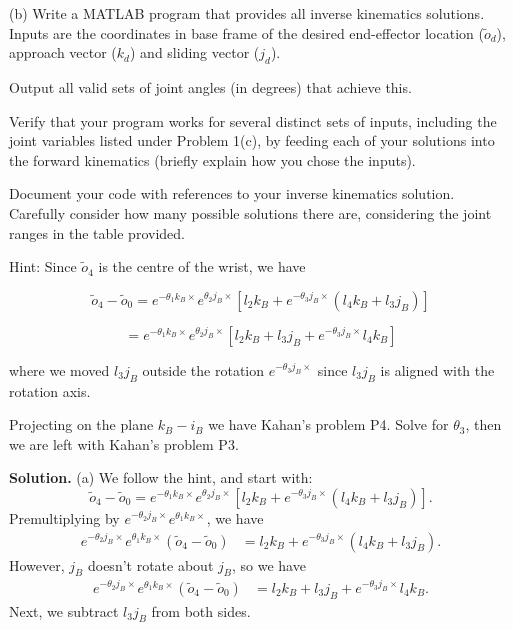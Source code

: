 \documentclass[11pt]{article}
\begin{document}
(b) Write a MATLAB program that provides all inverse kinematics solutions.
Inputs are the coordinates in base frame of the desired end-effector location
($\tilde{o}_d$), approach vector ($k_d$) and sliding vector ($j_d$).

Output all valid sets of joint angles (in degrees) that achieve this.

Verify that your program works for several distinct sets of inputs, including
the joint variables listed under Problem 1(c), by feeding each of your
solutions into the forward kinematics (briefly explain how you chose the inputs).

Document your code with references to your inverse kinematics solution.
Carefully consider how many possible solutions there are, considering the
joint ranges in the table provided.

\vspace{0.4cm}

\noindent
Hint: Since $\tilde{o}_4$ is the centre of the wrist, we have

\[
\tilde{o}_4 - \tilde{o}_0 =
e^{-\theta_1 k_B \times}
e^{\theta_2 j_B \times}
\left[
l_2 k_B
+
e^{-\theta_3 j_B \times}
(l_4 k_B + l_3 j_B)
\right]
\]

\[
=
e^{-\theta_1 k_B \times}
e^{\theta_2 j_B \times}
\left[
l_2 k_B + l_3 j_B
+
e^{-\theta_3 j_B \times} l_4 k_B
\right]
\]

where we moved $l_3 j_B$ outside the rotation $e^{-\theta_3 j_B\times}$ since
$l_3 j_B$ is aligned with the rotation axis.

Projecting on the plane $k_B - i_B$ we have Kahan’s problem P4.
Solve for $\theta_3$, then we are left with Kahan’s problem P3.

\vspace{3em}

\textbf{Solution.}
(a)
We follow the hint, and start with:
\[
    \tilde{o}_{4} - \tilde{o}_0 = e^{-\theta_1 k_B \times } e^{\theta_2 j_B \times} \left[ l_2 k_B + e^{-\theta_3 j_B \times } (l_4 k_B + l_3 j_B) \right] 
.\]
Premultiplying by $e^{-\theta_2 j_B \times}e^{\theta_1 k_B \times}$, we have
\begin{align}
    e^{-\theta_2 j_B \times}e^{\theta_1 k_B \times} (\tilde{o}_{4} - \tilde{o}_0) &= l_2 k_B + e^{- \theta_3 j_B \times } (l_4 k_B + l_3 j_B) \label{eq:label_name}
.\end{align}
However, $j_B$ doesn't rotate about $j_B$, so we have
\begin{align*}
    e^{-\theta_2 j_B \times}e^{\theta_1 k_B \times} (\tilde{o}_{4} - \tilde{o}_0) &= l_2 k_B + l_3 j_B + e^{- \theta_3 j_B \times } l_4 k_B
.\end{align*}
Next, we subtract $l_3 j_B$ from both sides.
\end{document}
